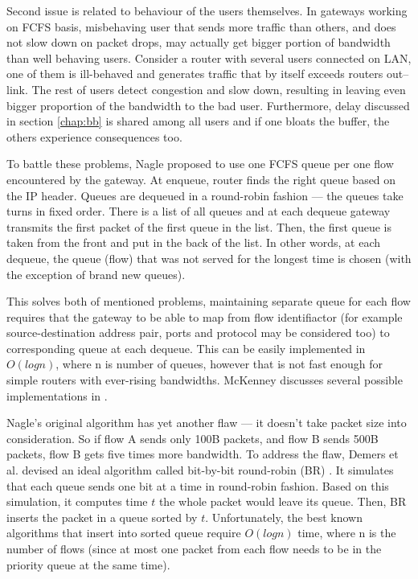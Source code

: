 Second issue is related to behaviour of the users themselves. In gateways working on FCFS basis, misbehaving user that sends more traffic than others, and does not slow down on packet drops, may actually get bigger portion of bandwidth than well behaving users. Consider a router with several users connected on LAN, one of them is ill-behaved and generates traffic that by itself exceeds routers out--link. The rest of users detect congestion and slow down, resulting in leaving even bigger proportion of the bandwidth to the bad user. Furthermore, delay discussed in section \ref{chap:bb} is shared among all users and if one bloats the buffer, the others experience consequences too.

To battle these problems, Nagle \cite{Nagle:FQ} proposed to use one FCFS queue per one flow encountered by the gateway. At enqueue, router finds the right queue based on the IP header. Queues are dequeued in a round-robin fashion --- the queues take turns in fixed order. There is a list of all queues and at each dequeue gateway transmits the first packet of the first queue in the list. Then, the first queue is taken from the front and put in the back of the list. In other words, at each dequeue, the queue (flow) that was not served for the longest time is chosen (with the exception of brand new queues).


This solves both of mentioned problems, maintaining separate queue for each flow requires that the gateway to be able to map from flow identifiactor (for example source-destination address pair, ports and protocol may be considered too) to corresponding queue at each dequeue. This can be easily implemented in $O(log n)$, where n is number of queues, however that is not fast enough for simple routers with ever-rising bandwidths. McKenney discusses several possible implementations in \cite[Section 2]{SFQ}.

Nagle's original algorithm has yet another flaw --- it doesn't take packet size into consideration. So if flow A sends only 100B packets, and flow B sends 500B packets, flow B gets five times more bandwidth. To address the flaw,  Demers et al. devised an ideal algorithm called bit-by-bit round-robin (BR) \cite{demers1989analysis}. It simulates that each queue sends one bit at a time in round-robin fashion. Based on this simulation, it computes time $t$ the whole packet would leave its queue. Then, BR inserts the packet in a queue sorted by $t$. Unfortunately, the best known algorithms that insert into sorted queue require $O(log n)$ time, where n is the number of flows (since at most one packet from each flow needs to be in the priority queue at the same time).

